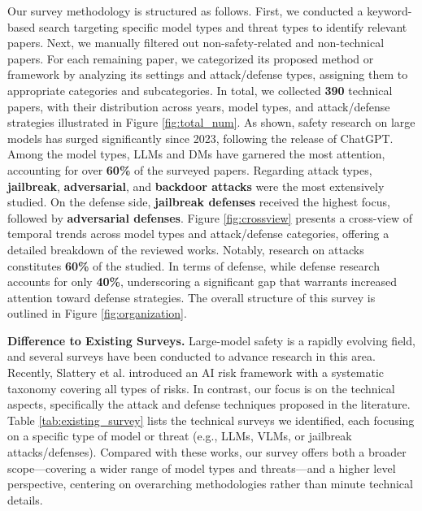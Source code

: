 Our survey methodology is structured as follows. First, we conducted a keyword-based search targeting specific model types and threat types to identify relevant papers. Next, we manually filtered out non-safety-related and non-technical papers. For each remaining paper, we categorized its proposed method or framework by analyzing its settings and attack/defense types, assigning them to appropriate categories and subcategories.
In total, we collected \textbf{390} technical papers, with their distribution across years, model types, and attack/defense strategies illustrated in Figure \ref{fig:total_num}. As shown, safety research on large models has surged significantly since 2023, following the release of ChatGPT. Among the model types, LLMs and DMs have garnered the most attention, accounting for over \textbf{60\%} of the surveyed papers. Regarding attack types, \textbf{jailbreak}, \textbf{adversarial}, and \textbf{backdoor attacks} were the most extensively studied. On the defense side, \textbf{jailbreak defenses} received the highest focus, followed by \textbf{adversarial defenses}.
Figure \ref{fig:crossview} presents a cross-view of temporal trends across model types and attack/defense categories, offering a detailed breakdown of the reviewed works. Notably, research on attacks constitutes \textbf{60\%} of the studied. In terms of defense, while defense research accounts for only \textbf{40\%}, underscoring a significant gap that warrants increased attention toward defense strategies. The overall structure of this survey is outlined in Figure \ref{fig:organization}.

\textbf{Difference to Existing Surveys.} Large-model safety is a rapidly evolving field, and several surveys have been conducted to advance research in this area. Recently, Slattery et al. \cite{slattery2024ai} introduced an AI risk framework with a systematic taxonomy covering all types of risks. In contrast, our focus is on the technical aspects, specifically the attack and defense techniques proposed in the literature.
Table \ref{tab:existing_survey} lists the technical surveys we identified, each focusing on a specific type of model or threat (e.g., LLMs, VLMs, or jailbreak attacks/defenses). Compared with these works, our survey offers both a broader scope—covering a wider range of model types and threats—and a higher level perspective, centering on overarching methodologies rather than minute technical details.
